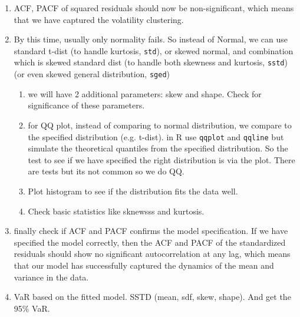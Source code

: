 \begin{enumerate}
    \item ACF, PACF of squared residuals should now be non-significant, which means that we have captured the volatility clustering.
    \item By this time, usually only normality fails. So instead of Normal, we can use standard t-dist (to handle kurtosis, \texttt{std}), or skewed normal, and combination which is skewed standard dist (to handle both skewness and kurtosis, \texttt{sstd}) (or even skewed general distribution, \texttt{sged})
    \begin{enumerate}
        \item we will have 2 additional parameters: skew and shape. Check for significance of these parameters. 
        \item for QQ plot, instead of comparing to normal distribution, we compare to the specified distribution (e.g. t-dist). in R use \texttt{qqplot} and \texttt{qqline} but simulate the theoretical quantiles from the specified distribution. So the test to see if we have specified the right distribution is via the plot. There are tests but its not common so we do QQ. 
        \item Plot histogram to see if the distribution fits the data well. 
        \item Check basic statistics like sknewsss and kurtosis. 
    \end{enumerate}
    \item finally check if ACF and PACF confirms the model specification. If we have specified the model correctly, then the ACF and PACF of the standardized residuals should show no significant autocorrelation at any lag, which means that our model has successfully captured the dynamics of the mean and variance in the data.
    \item VaR based on the fitted model. SSTD (mean, sdf, skew, shape). And get the 95\% VaR. 
\end{enumerate}
